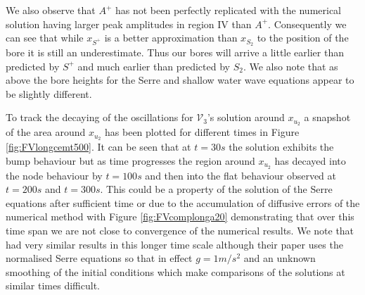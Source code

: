 \documentclass[SingleSpace,12pt,Proceedings]{Serre_ASCE}
\begin{document}
We also observe that $A^+$ has not been perfectly replicated with the numerical solution having larger peak amplitudes in region IV than $A^+$. Consequently we can see that while $x_{S^+}$ is a better approximation than $x_{S_2}$ to the position of the bore it is still an underestimate. Thus our bores will arrive a little earlier than predicted by $S^+$ and much earlier than predicted by $S_2$. We also note that as above the bore heights for the Serre and shallow water wave equations appear to be slightly different.

To track the decaying of the oscillations for $\mathcal{V}_3$'s solution around $x_{u_2}$ a snapshot of the area around $x_{u_2}$ has been plotted for different times in Figure \ref{fig:FVlongcemt500}. It can be seen that at $t =30s$ the solution exhibits the bump behaviour but as time progresses the region around $x_{u_2}$ has decayed into the node behaviour by $t=100s$ and then into the flat behaviour observed at $t=200s$ and $t=300s$. This could be a property of the solution of the Serre equations after sufficient time or due to the accumulation of diffusive errors of the numerical method with Figure \ref{fig:FVcomplonga20} demonstrating that over this time span we are not close to convergence of the numerical results. We note that  had very similar results in this longer time scale although their paper uses the normalised Serre equations so that in effect $g=1m/s^2$ and an unknown smoothing of the initial conditions which make comparisons of the solutions at similar times difficult.   
\end{document}
